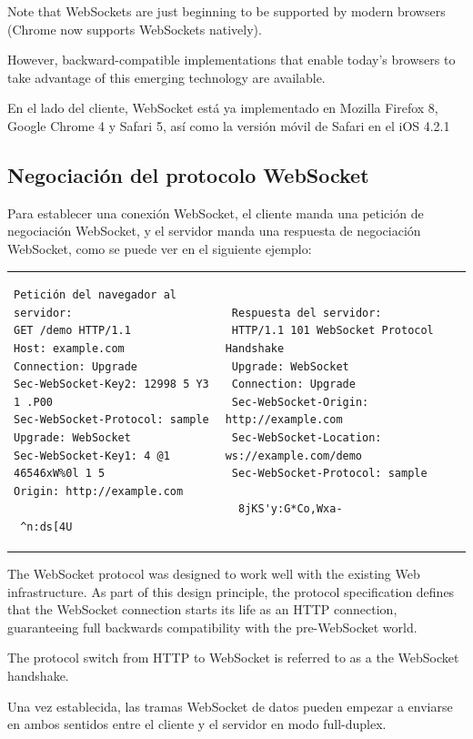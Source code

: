 Note
that WebSockets are just beginning to be supported by modern browsers
(Chrome now supports WebSockets natively). 

However, backward-compatible
implementations that enable today's browsers to take advantage of this
emerging technology are available.

En el lado del cliente, WebSocket está ya implementado en Mozilla
Firefox 8, Google Chrome 4 y Safari 5, así como la versión móvil de
Safari en el iOS 4.2.1

\subsection{Negociación del protocolo WebSocket}

Para establecer una conexión WebSocket, el cliente manda una petición de
negociación WebSocket, y el servidor manda una respuesta de negociación
WebSocket, como se puede ver en el siguiente ejemplo:

\begin{tabular}{|p{6cm}|p{6cm}|}
\begin{verbatim}
Petición del navegador al servidor:
GET /demo HTTP/1.1
Host: example.com
Connection: Upgrade
Sec-WebSocket-Key2: 12998 5 Y3 1 .P00
Sec-WebSocket-Protocol: sample
Upgrade: WebSocket
Sec-WebSocket-Key1: 4 @1 46546xW%0l 1 5
Origin: http://example.com
 
 ^n:ds[4U
\end{verbatim}
&
\begin{verbatim}
 Respuesta del servidor:
 HTTP/1.1 101 WebSocket Protocol Handshake
 Upgrade: WebSocket
 Connection: Upgrade
 Sec-WebSocket-Origin: http://example.com
 Sec-WebSocket-Location: ws://example.com/demo
 Sec-WebSocket-Protocol: sample
  
  8jKS'y:G*Co,Wxa-
\end{verbatim}
\end{tabular}

The WebSocket protocol was designed to work well with the existing
Web infrastructure. As part of this design principle, the protocol
specification defines that the WebSocket connection starts its
life as an HTTP connection, guaranteeing full backwards compatibility
with the pre-WebSocket world. 

The protocol switch from HTTP to WebSocket
is referred to as a the WebSocket handshake.

Una vez establecida, las tramas WebSocket de datos pueden empezar
a enviarse en ambos sentidos entre el cliente y el servidor en modo
full-duplex. 

